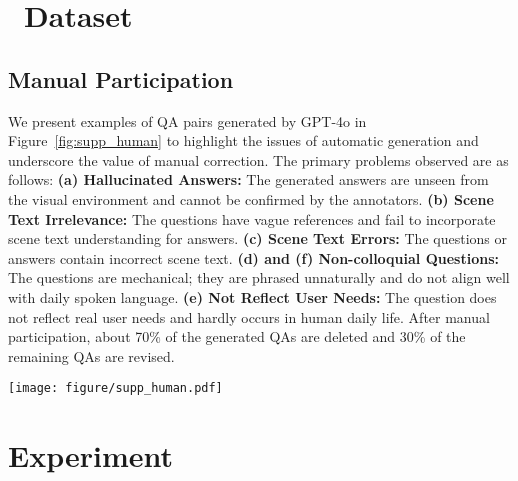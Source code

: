 \clearpage
\setcounter{page}{12}
\maketitlesupplementary

\setcounter{section}{0} 
\renewcommand{\thesection}{\Alph{section}}

\section{\dataset~Dataset} 
\label{sup:data}
\subsection{Manual Participation}
We present examples of QA pairs generated by GPT-4o in Figure~\ref{fig:supp_human} to highlight the issues of automatic generation and underscore the value of manual correction. The primary problems observed are as follows: 
\textbf{(a) Hallucinated Answers:} The generated answers are unseen from the visual environment and cannot be confirmed by the annotators.
\textbf{(b) Scene Text Irrelevance:} The questions have vague references and fail to incorporate scene text understanding for answers. 
\textbf{(c) Scene Text Errors:} The questions or answers contain incorrect scene text. 
\textbf{(d) and (f) Non-colloquial Questions:} The questions are mechanical; they are phrased unnaturally and do not align well with daily spoken language. 
\textbf{(e) Not Reflect User Needs:} The question does not reflect real user needs and hardly occurs in human daily life.
After manual participation, about 70\% of the generated QAs are deleted and 30\% of the remaining QAs are revised. 


\begin{figure*}
\centering
\texttt{[image: figure/supp\_human.pdf]}
\caption{Manual participation on \dataset~creation.}
\label{fig:supp_human}
\end{figure*}


\section{Experiment}

